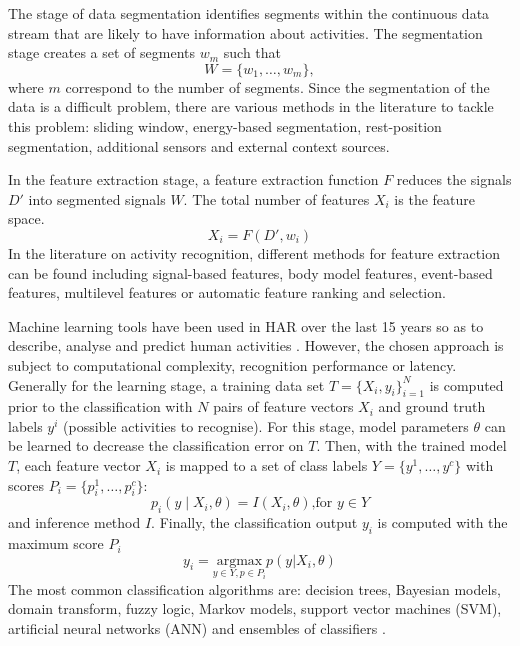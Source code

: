 \documentclass[10pt,journal,compsoc]{IEEEtran}
\begin{document}
The stage of data segmentation identifies segments within the continuous data stream
that are likely to have information about activities. The segmentation stage creates 
a set of segments $w_m$ %
such that 
\begin{equation}
W = \{   w_1, \dots, w_m  \},
\end{equation} 
where $m$ correspond to the number of segments.
Since the segmentation of the data is a difficult problem, there are various methods 
in the literature to tackle this problem: sliding window, energy-based segmentation, 
rest-position segmentation, additional sensors and external context sources.

In the feature extraction stage, a feature extraction function $F$ reduces
the signals $D'$  into segmented signals $W$.
The total number of features $X_i$ is the feature space.
\begin{equation}
X_i = F ( D', w_i)
\end{equation} 
In the literature on activity recognition, different  methods for feature extraction 
can be found including signal-based features, body model features, event-based features, 
multilevel features or automatic feature ranking and selection.


Machine learning tools have been used in HAR over the last 15 years
so as to describe, analyse and predict human activities \cite{bulling2014}.
However, the chosen approach is subject to computational complexity,
recognition performance or latency.
Generally for the learning stage, a training data set $T = \{ X_i, y_i \}  ^N _ {i=1}$ 
is computed prior to the classification with $N$ pairs of feature vectors $X_i$ and ground 
truth labels $y^i$ (possible activities to recognise). For this stage, model parameters $\theta$ can be learned 
to decrease the classification error on $T$. 
Then, with the trained model $T$,
each feature vector $X_i$  is mapped to a set of class labels 
$Y= \{ y^1, \dots , y^c \}$ with scores $P_i = \{ p^1_i, \dots, p^c_i \}$:
\begin{equation}
p_i ( y \mid X_i, \theta) = I (X_i, \theta) \mbox{,for } y \in Y
\end{equation} 
and inference method $I$.
Finally, the classification output $y_i$ is computed with the maximum score $P_i$
\begin{equation}
y_i  = 
\underset{ y \in Y, p \in P_i }{\text{argmax}}   p(y | X_i, \theta)
\end{equation} 
The most common classification algorithms are: decision trees, Bayesian models, %
domain transform, fuzzy logic, Markov models, support vector machines (SVM), 
artificial neural networks (ANN) and ensembles of classifiers \cite{Lara2013}.
\end{document}
